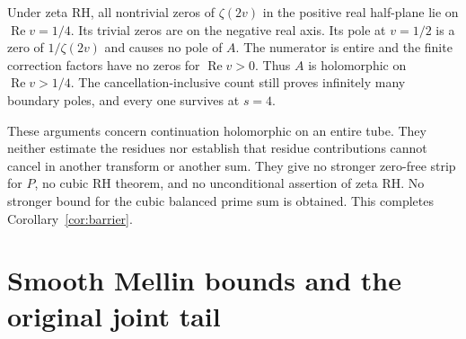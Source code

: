 \documentclass[11pt]{article}
\numberwithin{equation}{section}
\newcommand{\Rea}{\operatorname{Re}}
\begin{document}
Under zeta RH, all nontrivial zeros of $\zeta(2v)$ in the positive
real half-plane lie on $\Rea v=1/4$. Its trivial zeros are on the
negative real axis. Its pole at $v=1/2$ is a zero of
$1/\zeta(2v)$ and causes no pole of $A$. The numerator is entire
and the finite correction factors have no zeros for $\Rea v>0$.
Thus $A$ is holomorphic on $\Rea v>1/4$. The cancellation-inclusive
count still proves infinitely many boundary poles, and every one
survives at $s=4$.

These arguments concern continuation holomorphic on an entire
tube. They neither estimate the residues nor establish that
residue contributions cannot cancel in another transform or
another sum. They give no stronger zero-free strip for $P$,
no cubic RH theorem, and no unconditional assertion of zeta RH.
No stronger bound for the cubic balanced prime sum is obtained. This completes Corollary~\ref{cor:barrier}.


\section{Smooth Mellin bounds and the original joint tail}
\end{document}

